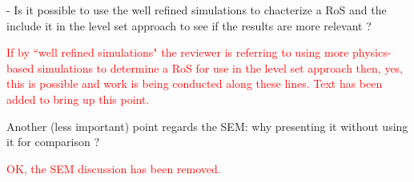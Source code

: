 \documentclass[12pt]{article}
\newcommand\hl[1]{\textcolor{red}{#1}}
\begin{document}
- Is it possible to use  the well refined simulations to chacterize a RoS and the include it in the level set approach to see if the results are more relevant ?

\hl{If by ``well refined simulations" the reviewer is referring to using more physics-based simulations to determine a RoS for use in the level set approach then, yes, this is possible and work is being conducted along these lines. Text has been added to bring up this point.}

Another (less important) point regards the SEM: why presenting it without using it for comparison ?

\hl{OK, the SEM discussion has been removed.}
\end{document}
